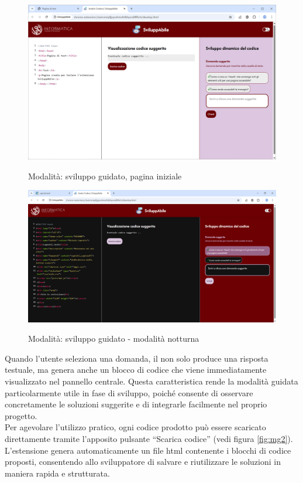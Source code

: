 \begin{figure}[H]
    \centering
    \includegraphics[width=1\linewidth, alt={Modalità di sviluppo guidato}]{img/mg.png}
    \caption{Modalità: sviluppo guidato, pagina iniziale}\label{fig:mg}
\end{figure}

\begin{figure}[H]
    \centering
    \includegraphics[width=1\linewidth, alt={Modalità di sviluppo guidato - modalità notturna}]{img/mg_dark.png}
    \caption{Modalità: sviluppo guidato - modalità notturna}\label{fig:mg_notte}
\end{figure}

\noindent Quando l’utente seleziona una domanda, il  non solo produce una risposta testuale, ma genera anche un blocco di codice che viene immediatamente visualizzato nel pannello centrale. Questa caratteristica rende la modalità guidata particolarmente utile in fase di sviluppo, poiché consente di osservare concretamente le soluzioni suggerite e di integrarle facilmente nel proprio progetto.\\
Per agevolare l’utilizzo pratico, ogni codice prodotto può essere scaricato direttamente tramite l’apposito pulsante “Scarica codice” (vedi figura \ref{fig:mg2}). L’estensione genera automaticamente un file \acrshort{html} contenente i blocchi di codice proposti, consentendo allo sviluppatore di salvare e riutilizzare le soluzioni in maniera rapida e strutturata.

